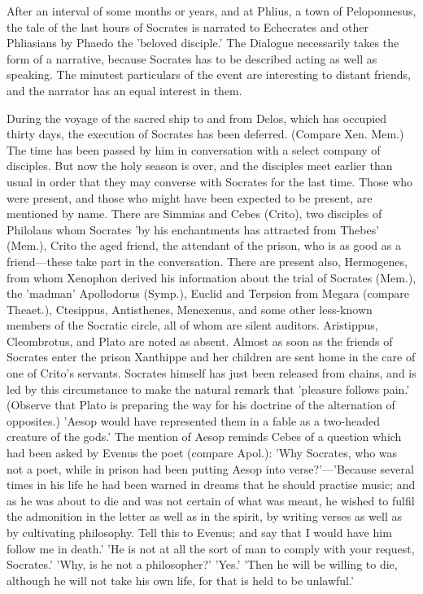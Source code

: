 
After an interval of some months or years, and at Phlius, a town of
Peloponnesus, the tale of the last hours of Socrates is narrated to
Echecrates and other Phliasians by Phaedo the 'beloved disciple.' The
Dialogue necessarily takes the form of a narrative, because Socrates has
to be described acting as well as speaking. The minutest particulars of
the event are interesting to distant friends, and the narrator has an
equal interest in them.

During the voyage of the sacred ship to and from Delos, which has occupied
thirty days, the execution of Socrates has been deferred. (Compare Xen.
Mem.) The time has been passed by him in conversation with a select
company of disciples. But now the holy season is over, and the disciples
meet earlier than usual in order that they may converse with Socrates for
the last time. Those who were present, and those who might have been
expected to be present, are mentioned by name. There are Simmias and Cebes
(Crito), two disciples of Philolaus whom Socrates 'by his enchantments has
attracted from Thebes' (Mem.), Crito the aged friend, the attendant of the
prison, who is as good as a friend—these take part in the
conversation. There are present also, Hermogenes, from whom Xenophon
derived his information about the trial of Socrates (Mem.), the 'madman'
Apollodorus (Symp.), Euclid and Terpsion from Megara (compare Theaet.),
Ctesippus, Antisthenes, Menexenus, and some other less-known members of
the Socratic circle, all of whom are silent auditors. Aristippus,
Cleombrotus, and Plato are noted as absent. Almost as soon as the friends
of Socrates enter the prison Xanthippe and her children are sent home in
the care of one of Crito's servants. Socrates himself has just been
released from chains, and is led by this circumstance to make the natural
remark that 'pleasure follows pain.' (Observe that Plato is preparing the
way for his doctrine of the alternation of opposites.) 'Aesop would have
represented them in a fable as a two-headed creature of the gods.' The
mention of Aesop reminds Cebes of a question which had been asked by
Evenus the poet (compare Apol.): 'Why Socrates, who was not a poet, while
in prison had been putting Aesop into verse?'—'Because several times
in his life he had been warned in dreams that he should practise music;
and as he was about to die and was not certain of what was meant, he
wished to fulfil the admonition in the letter as well as in the spirit, by
writing verses as well as by cultivating philosophy. Tell this to Evenus;
and say that I would have him follow me in death.' 'He is not at all the
sort of man to comply with your request, Socrates.' 'Why, is he not a
philosopher?' 'Yes.' 'Then he will be willing to die, although he will not
take his own life, for that is held to be unlawful.'

